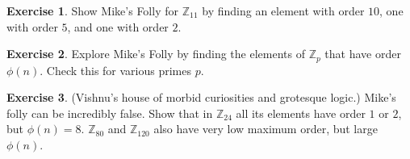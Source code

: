 \documentclass[11pt]{article}
\theoremstyle{definition}
\newtheorem{exercise}{Exercise}
\numberwithin{thm}{section}
\begin{document}
\begin{exercise} Show Mike's Folly for $\mathbb{Z}_{11}$ by finding an element with order $10$, one with order $5$, and one with order $2$.
\end{exercise}

\begin{exercise} Explore Mike's Folly by finding the elements of $\mathbb{Z}_p$ that have order $\phi(n)$. Check this for various primes $p$.
\end{exercise}

\begin{exercise} (Vishnu's house of morbid curiosities and grotesque logic.) Mike's folly can be incredibly false. Show that in $\mathbb{Z}_{24}$ all its elements have order $1$ or $2$, but $\phi(n) = 8$. $\mathbb{Z}_{80}$ and $\mathbb{Z}_{120}$ also have very low maximum order, but large $\phi(n)$.
\end{exercise}
\end{document}
